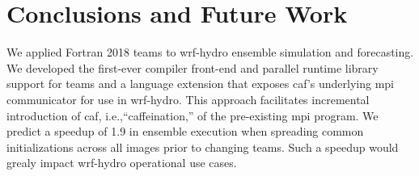 \section{Conclusions and Future Work}\label{sec:conclusions}
We applied Fortran 2018 teams to \gls{wrf-hydro} ensemble simulation and forecasting.
We developed the first-ever compiler front-end and parallel runtime library support
for teams and a language extension that exposes \gls{caf}'s
underlying \gls{mpi} communicator for use in \gls{wrf-hydro}.  This approach facilitates
incremental introduction of \gls{caf}, i.e.,``caffeination,'' of the
pre-existing \gls{mpi} program.  We predict a speedup of 1.9 in ensemble execution when
spreading common initializations across all images prior to changing teams.  Such a speedup
would grealy impact \gls{wrf-hydro} operational use cases.






